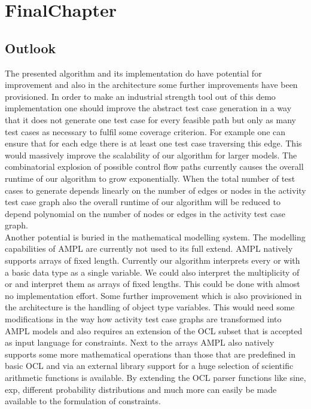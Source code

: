 \chapter{FinalChapter}
\section{Outlook}
The presented algorithm and its implementation do have potential for improvement and also in the architecture some further improvements have been provisioned.
In order to make an industrial strength tool out of this demo implementation one should improve the abstract test case generation in a way that it does not generate one test case for every feasible path but only as many test cases as necessary to fulfil some coverage criterion. For example one can ensure that for each edge there is at least one test case traversing this edge. This would massively improve the scalability of our algorithm for larger models. The combinatorial explosion of possible control flow paths currently causes the overall runtime of our algorithm to grow exponentially. When the total number of test cases to generate depends linearly on the number of edges or nodes in the activity test case graph also the overall runtime of our algorithm will be reduced to depend polynomial on the number of nodes or edges in the activity test case graph.\\
Another potential is buried in the mathematical modelling system. The modelling capabilities of AMPL are currently not used to its full extend. AMPL natively supports arrays of fixed length. Currently our algorithm interprets every  or  with a basic data type as a single variable. We could also interpret the multiplicity of  or  and interpret them as arrays of fixed lengths. This could be done with almost no implementation effort. Some further improvement which is also provisioned in the architecture is the handling of object type variables. This would need some modifications in the way how activity test case graphs are transformed into AMPL models and also requires an extension of the OCL subset that is accepted as input language for constraints.
Next to the arrays AMPL also natively supports some more mathematical operations than those that are predefined in basic OCL and via an external library support for a huge selection of scientific arithmetic functions is available. By extending the OCL parser functions like sine, exp, different probability distributions and much more can easily be made available to the formulation of constraints.\\
